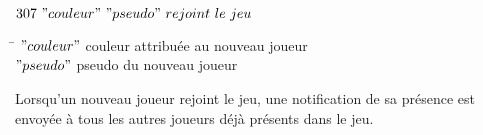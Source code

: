 \par

$307 ~ "couleur" ~ "pseudo" ~ rejoint ~ le ~ jeu$

\begin{tabbing}
\hspace{2cm}\=\kill
 $"couleur"$ \> couleur attribuée au nouveau joueur \\ 
 $"pseudo"$  \> pseudo du nouveau joueur \\
\end{tabbing} 

Lorsqu'un nouveau joueur rejoint le jeu, une notification de sa présence est envoyée à tous les autres joueurs déjà présents dans le jeu. \\
